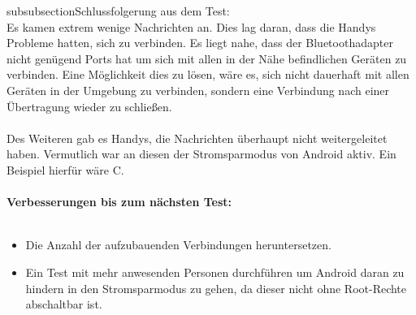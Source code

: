 subsubsection{Schlussfolgerung aus dem
Test:}\label{schlussfolgerung-aus-dem-test}\\

Es kamen extrem wenige Nachrichten an. Dies lag daran, dass die Handys
Probleme hatten, sich zu verbinden. Es liegt nahe, dass der
Bluetoothadapter nicht genügend Ports hat um sich mit allen in der Nähe
befindlichen Geräten zu verbinden. Eine Möglichkeit dies zu lösen, wäre
es, sich nicht dauerhaft mit allen Geräten in der Umgebung zu verbinden,
sondern eine Verbindung nach einer Übertragung wieder zu schließen.
\\\\
Des Weiteren gab es Handys, die Nachrichten überhaupt nicht
weitergeleitet haben. Vermutlich war an diesen der Stromsparmodus von
Android aktiv. Ein Beispiel hierfür wäre C.
\\\\
\textbf{Verbesserungen bis zum nächsten Test:}
\\\\
\begin{itemize}
\tightlist
\item
  Die Anzahl der aufzubauenden Verbindungen heruntersetzen.
\item
  Ein Test mit mehr anwesenden Personen durchführen um Android daran zu
  hindern in den Stromsparmodus zu gehen, da dieser nicht ohne
  Root-Rechte abschaltbar ist.
\end{itemize}

